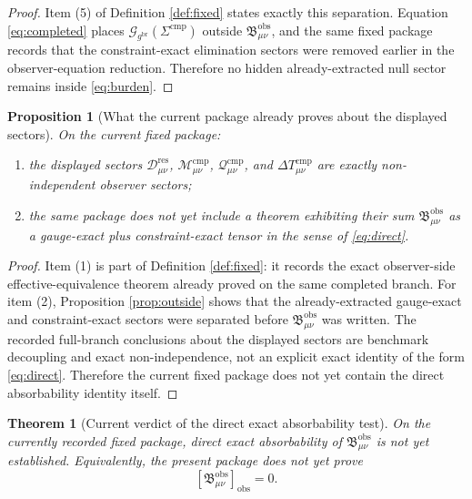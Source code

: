 \documentclass[11pt]{article}
\newcommand{\ObserverMetric}{g^{\mathrm{br}}}
\newcommand{\CompShift}{\Sigma^{\mathrm{cmp}}}
\newcommand{\ResidualDec}{\mathcal D_{\mu\nu}^{\mathrm{res}}}
\newcommand{\GaugeBook}{\mathcal G_{\ObserverMetric}}
\newcommand{\CompMix}{\mathcal M_{\mu\nu}^{\mathrm{cmp}}}
\newcommand{\CompQuad}{\mathcal Q_{\mu\nu}^{\mathrm{cmp}}}
\newcommand{\DeltaTComp}{\Delta T_{\mu\nu}^{\mathrm{cmp}}}
\newcommand{\ObsBurden}{\mathfrak B_{\mu\nu}^{\mathrm{obs}}}
\newcommand{\ObserverClass}[1]{\left[#1\right]_{\mathrm{obs}}}
\newtheorem{proposition}{Proposition}
\newtheorem{theorem}{Theorem}
\begin{document}
\begin{proof}
Item (5) of Definition \ref{def:fixed} states exactly this separation. Equation \eqref{eq:completed} places \(\GaugeBook(\CompShift)\) outside \(\ObsBurden\), and the same fixed package records that the constraint-exact elimination sectors were removed earlier in the observer-equation reduction. Therefore no hidden already-extracted null sector remains inside \eqref{eq:burden}.
\end{proof}

\begin{proposition}[What the current package already proves about the displayed sectors]
\label{prop:current}
On the current fixed package:
\begin{enumerate}
    \item the displayed sectors \(\ResidualDec\), \(\CompMix\), \(\CompQuad\), and \(\DeltaTComp\) are exactly non-independent observer sectors;
    \item the same package does not yet include a theorem exhibiting their sum \(\ObsBurden\) as a gauge-exact plus constraint-exact tensor in the sense of \eqref{eq:direct}.
\end{enumerate}
\end{proposition}

\begin{proof}
Item (1) is part of Definition \ref{def:fixed}: it records the exact observer-side effective-equivalence theorem already proved on the same completed branch. For item (2), Proposition \ref{prop:outside} shows that the already-extracted gauge-exact and constraint-exact sectors were separated before \(\ObsBurden\) was written. The recorded full-branch conclusions about the displayed sectors are benchmark decoupling and exact non-independence, not an explicit exact identity of the form \eqref{eq:direct}. Therefore the current fixed package does not yet contain the direct absorbability identity itself.
\end{proof}

\begin{theorem}[Current verdict of the direct exact absorbability test]
\label{thm:test}
On the currently recorded fixed package, direct exact absorbability of \(\ObsBurden\) is not yet established. Equivalently, the present package does not yet prove
\begin{equation}
\ObserverClass{\ObsBurden}=0.
\label{eq:notproved}
\end{equation}
\end{theorem}
\end{document}
